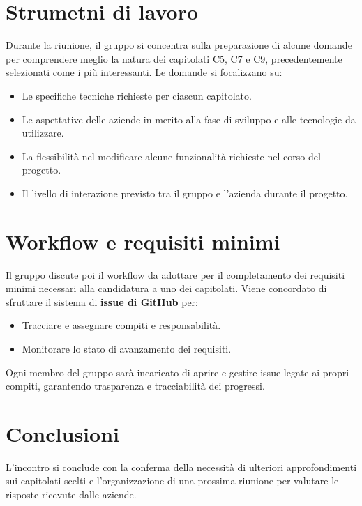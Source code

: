 \documentclass[a4paper, 12pt]{article}
\newcommand{\glossario}[1]{\fontfamily{lmr}\selectfont{\textit{#1\textsubscript{\small G}}}}
\begin{document}
\section{Strumetni di lavoro}
Durante la riunione, il gruppo si concentra sulla preparazione di alcune domande per comprendere meglio la natura dei capitolati C5, C7 e C9, precedentemente selezionati come i più interessanti. Le domande si focalizzano su:
\begin{itemize}
    \item  Le specifiche tecniche richieste per ciascun capitolato.
    \item Le aspettative delle aziende in merito alla fase di sviluppo e alle tecnologie da utilizzare.
    \item La flessibilità nel modificare alcune funzionalità richieste nel corso del progetto.
    \item Il livello di interazione previsto tra il gruppo e l'azienda durante il progetto.
\end{itemize}

\section{Workflow e requisiti minimi}
 Il gruppo discute poi il workflow da adottare per il completamento dei requisiti minimi necessari alla candidatura a uno dei capitolati. Viene concordato di sfruttare il sistema di \textbf{issue di GitHub} per:
\begin{itemize}
    \item  Tracciare e assegnare compiti e responsabilità.
    \item Monitorare lo stato di avanzamento dei requisiti.
\end{itemize}
Ogni membro del gruppo sarà incaricato di aprire e gestire issue legate ai propri compiti, garantendo trasparenza e tracciabilità dei progressi.

\section{Conclusioni}
L’incontro si conclude con la conferma della necessità di ulteriori approfondimenti sui capitolati scelti e l’organizzazione di una prossima riunione per valutare le risposte ricevute dalle aziende.



\end{document}

